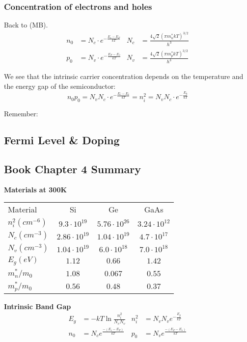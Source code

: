 \documentclass[a4paper, fontsize=8pt, landscape, DIV=1]{scrartcl}
\begin{document}
\begin{multicols*}{4}
  \subsubsection{Concentration of electrons and holes}
  Back to (MB).
  \begin{align*}
    n_0 &= N_c \cdot e^{-\frac{E_c-E_F}{kT}} & N_c &= \frac{4\sqrt{2}(\pi m^*_n kT)^{3/2}}{h^3} \\
    p_0 &= N_v \cdot e^{-\frac{E_F-E_v}{kT}} & N_v &= \frac{4\sqrt{2}(\pi m^*_p kT)^{3/2}}{h^3} 
  \end{align*}

  We see that the intrinsic carrier concentration depends on the temperature and the energy gap of the semiconductor:
  \[n_0 p_0 = N_v N_c \cdot e^{-\frac{E_c-E_v}{kT}} = n_i^2 = N_vN_c\cdot e^{-\frac{E_g}{kT}}\]

  Remember:

  \subsection{Fermi Level \& Doping}
  
  \subsection{Book Chapter 4 Summary}

    \textbf{Materials at 300K} \\
      \begin{tabular}[h]{l c c c}
        Material & Si & Ge & GaAs \\
        $n_i^2(cm^{-6})$  & $9.3\cdot 10^{19}$  & $5.76\cdot 10^{26}$ & $3.24\cdot 10^{12}$ \\
        $N_c(cm^{-3})$    & $2.86\cdot 10^{19}$ & $1.04\cdot 10^{19}$ & $4.7\cdot 10^{17}$ \\

        $N_v(cm^{-3})$    & $1.04\cdot 10^{19}$ & $6.0\cdot 10^{18}$  & $7.0\cdot 10^{18}$ \\
        $E_g (eV)$        & $1.12$ & $0.66$ & $1.42$ \\
        $m_n^*/m_0$       & $1.08$ & $0.067$ & $0.55$\\
        $m_p^*/m_0$       & $0.56$ & $0.48$ & $0.37$\\
      \end{tabular}

    \textbf{Intrinsic Band Gap} \\
      \begin{align*}
        E_g &= -kT\ln\frac{n_i^2}{N_c N_v} &
        n_i^2 &= N_v N_v e^{-\frac{E_g}{kT}} \\
        n_0 &= N_ce^{\frac{-(E_c-E_F)}{kT}} &
        p_0 &= N_ve^{\frac{-(E_F-E_v)}{kT}}
      \end{align*}


\end{multicols*}
\end{document}
